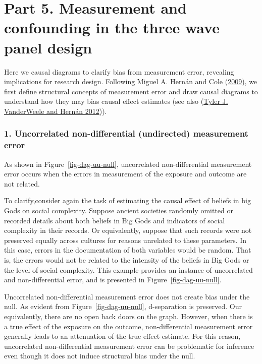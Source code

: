 \documentclass[
  singlecolumn]{report}
\begin{document}
\hypertarget{part-5.-measurement-and-confounding-in-the-three-wave-panel-design}{%
\section{Part 5. Measurement and confounding in the three wave panel
design}\label{part-5.-measurement-and-confounding-in-the-three-wave-panel-design}}

Here we causal diagrams to clarify bias from measurement error,
revealing implications for research design. Following Miguel A. Hernán
and Cole (\protect\hyperlink{ref-hernuxe1n2009}{2009}), we first define
structural concepts of measurement error and draw causal diagrams to
understand how they may bias causal effect estimates (see also
(\protect\hyperlink{ref-vanderweele2012a}{Tyler J. VanderWeele and
Hernán 2012})).

\hypertarget{uncorrelated-non-differential-undirected-measurement-error}{%
\subsubsection{\texorpdfstring{1. \textbf{Uncorrelated non-differential
(undirected) measurement
error}}{1. Uncorrelated non-differential (undirected) measurement error}}\label{uncorrelated-non-differential-undirected-measurement-error}}

As shown in Figure~\ref{fig-dag-uu-null}, uncorrelated non-differential
measurement error occurs when the errors in measurement of the exposure
and outcome are not related.

To clarify,consider again the task of estimating the causal effect of
beliefs in big Gods on social complexity. Suppose ancient societies
randomly omitted or recorded details about both beliefs in Big Gods and
indicators of social complexity in their records. Or equivalently,
suppose that such records were not preserved equally across cultures for
reasons unrelated to these parameters. In this case, errors in the
documentation of both variables would be random. That is, the errors
would not be related to the intensity of the beliefs in Big Gods or the
level of social complexity. This example provides an instance of
uncorrelated and non-differential error, and is presented in
Figure~\ref{fig-dag-uu-null}.

Uncorrelated non-differential measurement error does not create bias
under the null. As evident from Figure~\ref{fig-dag-uu-null},
d-separation is preserved. Our equivalently, there are no open back
doors on the graph. However, when there is a true effect of the exposure
on the outcome, non-differential measurement error generally leads to an
attenuation of the true effect estimate. For this reason, uncorrelated
non-differential measurement error can be problematic for inference even
though it does not induce structural bias under the null.
\end{document}
